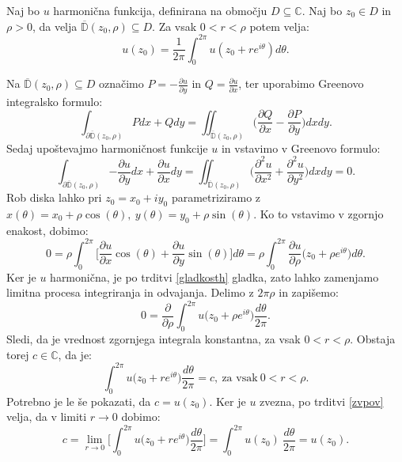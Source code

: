 \documentclass[mat1]{fmfdelo}
\newcommand{\C}{\mathbb C}
\begin{document}
    \begin{trditev}
        \label{harmonicnapovp}
        Naj bo $u$ harmonična funkcija, definirana na območju $D \subseteq \C$. Naj bo $z_0 \in D$ in $\rho > 0$, da velja $\overline{\mathbb{D}}(z_0, \rho) \subseteq D$. Za vsak $0 < r < \rho$ potem velja:
            $$
                u(z_0) = \frac{1}{2 \pi} \int_{0}^{2 \pi}{u(z_0 + r e^{i \theta}) d\theta}.
            $$
    \end{trditev}
    \begin{dokaz}
        Na $\overline{\mathbb{D}}(z_0, \rho) \subseteq D$ označimo $P = -\frac{\partial u}{\partial y}$ in $Q = \frac{\partial u}{\partial x}$, ter uporabimo Greenovo integralsko formulo:
        $$
            \int_{\partial \overline{\mathbb{D}}(z_0, \rho)}{P dx + Q dy} = \iint_{\overline{\mathbb{D}}(z_0, \rho)}{\bigg(\frac{\partial Q}{\partial x} - \frac{\partial P}{\partial y}\bigg)dx dy}.
        $$ 
        Sedaj upoštevajmo harmoničnost funkcije $u$ in vstavimo v Greenovo formulo:
        $$
        \int_{\partial \overline{\mathbb{D}}(z_0, \rho)}{-\frac{\partial u}{\partial y} dx + \frac{\partial u}{\partial x} dy} = \iint_{\overline{\mathbb{D}}(z_0, \rho)}{\bigg(\frac{\partial^2 u}{\partial x^2} + \frac{\partial^2 u}{\partial y^2}\bigg)dx dy} = 0. 
        $$
        Rob diska lahko pri $z_0 = x_0 + iy_0$ parametriziramo z $x(\theta) = x_0 + \rho \cos(\theta),~y(\theta) = y_0 + \rho \sin(\theta)$. Ko to vstavimo v zgornjo enakost, dobimo:
        $$
        0 = \rho \int_{0}^{2 \pi}{\bigg[\frac{\partial u}{\partial x} \cos(\theta) + \frac{\partial u}{\partial y} \sin(\theta)\bigg] d\theta} = \rho \int_{0}^{2\pi}{\frac{\partial u}{\partial \rho}\big({z_0 + \rho e^{i\theta}\big)d\theta}}.
        $$
        Ker je $u$ harmonična, je po trditvi \ref{gladkosth} gladka, zato lahko zamenjamo limitna procesa integriranja in odvajanja. Delimo z $2\pi \rho$ in zapišemo:
        $$
        0 = \frac{\partial}{\partial \rho} \int_{0}^{2\pi}{u\big({z_0 + \rho e^{i\theta}\big)\frac{d\theta}{2 \pi}}}.
        $$
        Sledi, da je vrednost zgornjega integrala konstantna, za vsak $0 <r < \rho$. Obstaja torej $c \in \mathbb{C}$, da je: 
        $$
        \int_{0}^{2\pi}{u\big({z_0 + r e^{i\theta}\big)\frac{d\theta}{2 \pi}}} = c,~\text{za vsak}~ 0 < r < \rho.
        $$
        Potrebno je le še pokazati, da $c = u(z_0)$.
        Ker je $u$ zvezna, po trditvi \ref{zvpov} velja, da v limiti $r \to 0$ dobimo:
        $$
        c = \lim_{r \to 0}{\bigg[\int_{0}^{2\pi}{u\big({z_0 + r e^{i\theta}\big)\frac{d\theta}{2 \pi}}}\bigg]} = \int_{0}^{2\pi}{{u(z_0)~\frac{d\theta}{2 \pi}}} = u(z_0).
        $$
    \end{dokaz}
\end{document}
